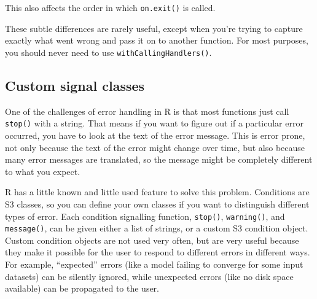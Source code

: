 \begin{itemize}
\begin{Shaded}
\begin{Highlighting}[]
\NormalTok{(}\NormalTok{(), } \NormalTok{(}\NormalTok{()))}
\end{Highlighting}
\end{Shaded}

  This also affects the order in which \texttt{on.exit()} is called.
\end{itemize}

These subtle differences are rarely useful, except when you're trying to
capture exactly what went wrong and pass it on to another function. For
most purposes, you should never need to use
\texttt{withCallingHandlers()}.

\subsection{Custom signal classes}

One of the challenges of error handling in R is that most functions just
call \texttt{stop()} with a string. That means if you want to figure out
if a particular error occurred, you have to look at the text of the
error message. This is error prone, not only because the text of the
error might change over time, but also because many error messages are
translated, so the message might be completely different to what you
expect. 

R has a little known and little used feature to solve this problem.
Conditions are S3 classes, so you can define your own classes if you
want to distinguish different types of error. Each condition signalling
function, \texttt{stop()}, \texttt{warning()}, and \texttt{message()},
can be given either a list of strings, or a custom S3 condition object.
Custom condition objects are not used very often, but are very useful
because they make it possible for the user to respond to different
errors in different ways. For example, ``expected'' errors (like a model
failing to converge for some input datasets) can be silently ignored,
while unexpected errors (like no disk space available) can be propagated
to the user.

